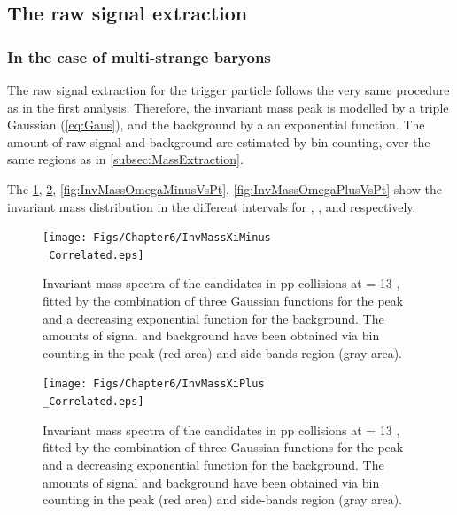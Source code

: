 \subsection{The raw signal extraction}
\label{subsec:CascadeResonanceSignalExtraction}

\subsubsection{In the case of multi-strange baryons}

The raw signal extraction for the trigger particle follows the very same procedure as in the first analysis. Therefore, the invariant mass peak is modelled by a triple Gaussian (\eq\ref{eq:Gaus}), and the background by a an exponential function. The amount of raw signal and background are estimated by bin counting, over the same regions as in \Sec\ref{subsec:MassExtraction}. 

The \figs\ref{fig:InvMassXiMinusVPt}, \ref{fig:InvMassXiPlusVPt}, \ref{fig:InvMassOmegaMinusVsPt}, \ref{fig:InvMassOmegaPlusVsPt} show the invariant mass distribution in the different \pT intervals for \rmXiM, \rmAxiP, \rmOmegaM and \rmAomegaP respectively.

\begin{landscape}
\begin{figure}[h]
	\centering
	\texttt{[image: Figs/Chapter6/InvMassXiMinus\\\_Correlated.eps]}
\caption{Invariant mass spectra of the \rmXiM candidates in pp collisions at \sqrtS = 13 \tev, fitted by the combination of three Gaussian functions for the peak and a decreasing exponential function for the background. The amounts of signal and background have been obtained via bin counting in the peak (red area) and side-bands region (gray area).}
	\label{fig:InvMassXiMinusVPt}
\end{figure}

\begin{figure}[h]
	\centering
	\texttt{[image: Figs/Chapter6/InvMassXiPlus\\\_Correlated.eps]}
\caption{Invariant mass spectra of the \rmAxiP candidates in pp collisions at \sqrtS = 13 \tev, fitted by the combination of three Gaussian functions for the peak and a decreasing exponential function for the background. The amounts of signal and background have been obtained via bin counting in the peak (red area) and side-bands region (gray area).}
	\label{fig:InvMassXiPlusVPt}
\end{figure}

\end{landscape}

